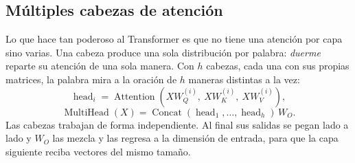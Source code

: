 \documentclass[11pt,letterpaper]{article}
\begin{document}
\subsection*{Múltiples cabezas de atención}

Lo que hace tan poderoso al Transformer es que no tiene una atención
por capa sino varias. Una cabeza produce una sola distribución por
palabra: \textit{duerme} reparte su atención de una sola manera. Con
$h$ cabezas, cada una con sus propias matrices, la palabra mira a la
oración de $h$ maneras distintas a la vez:
\[
    \operatorname{head}_i
        = \operatorname{Attention}(X W_Q^{(i)},\ X W_K^{(i)},\
                                   X W_V^{(i)}) ,
\]
\[
    \operatorname{MultiHead}(X)
        = \operatorname{Concat}(\operatorname{head}_1, \ldots,
                                \operatorname{head}_h)\, W_O .
\]
Las cabezas trabajan de forma independiente. Al final sus salidas se
pegan lado a lado y $W_O$ las mezcla y las regresa a la dimensión de
entrada, para que la capa siguiente reciba vectores del mismo tamaño.
\end{document}
